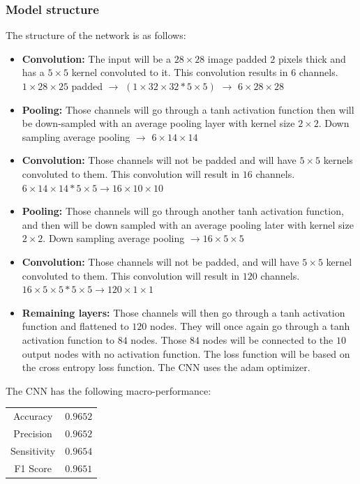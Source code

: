 \documentclass[a4paper,twoside,10pt]{article}
\begin{document}
\subsubsection{Model structure}
The structure of the network is as follows:
\begin{itemize}
    \item \textbf{Convolution:} The input will be a $28 \times 28$ image padded $2$ pixels thick and has a $5 \times 5$ kernel convoluted to it. This convolution results in $6$ channels. $1 \times 28 \times 25$ padded $\rightarrow$ $(1 \times 32 \times 32 * 5 \times 5)$ $\rightarrow$ $6 \times 28 \times 28$

    \item \textbf{Pooling:} Those channels will go through a tanh activation function then will be down-sampled with an average pooling layer with kernel size $2 \times 2$. Down sampling average pooling $\rightarrow$ $6 \times 14 \times 14$

    \item \textbf{Convolution:} Those channels will not be padded and will have $5 \times 5$ kernels convoluted to them. This convolution will result in $16$ channels. $6 \times 14 \times 14 * 5 \times 5 \rightarrow 16 \times 10 \times 10$
    

    \item \textbf{Pooling:} Those channels will go through another tanh activation function, and then will be down sampled with an average pooling later with kernel size $2 \times 2$.
    Down sampling average pooling $\rightarrow 16 \times 5 \times 5$

    \item \textbf{Convolution:} Those channels will not be padded, and will have $5 \times 5$ kernel convoluted to them. This convolution will result in $120$ channels. $16 \times 5 \times 5 * 5 \times 5 \rightarrow 120 \times 1 \times 1$
    

    \item \textbf{Remaining layers:} Those channels will then go through a tanh activation function and flattened to $120$ nodes. They will once again go through a tanh activation function to $84$ nodes. Those $84$ nodes will be connected to the $10$ output nodes with no activation function. The loss function will be based on the cross entropy loss function. The CNN uses the adam optimizer.
\end{itemize}

The CNN has the following macro-performance:
\begin{center}
\begin{tabular}{||c|c||}
    Accuracy & $0.9652$ \\
    Precision & $0.9652$ \\
    Sensitivity & $0.9654$ \\
    F1 Score & $0.9651$ \\
\end{tabular}
\end{center}
\end{document}
